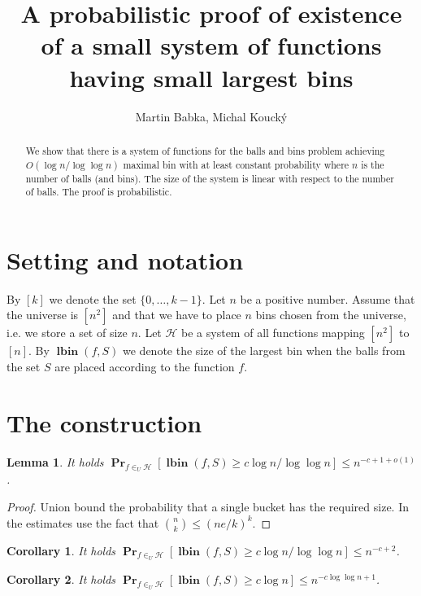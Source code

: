 \documentclass{article}
\title{A probabilistic proof of existence of a small system of functions having small largest bins}
\author{Martin Babka, Michal Kouck\'y}
\newcommand{\lbin}[2]{\operatorname{\mathbf{lbin}}({#1}, {#2})}
\newcommand{\probs}[2]{\operatorname{\mathbf{Pr}}_{{#1}}\left[{#2}\right]}
\newtheorem{lemma}{Lemma}
\newtheorem{corollary}{Corollary}
\begin{document}
\maketitle

\begin{abstract}
We show that there is a system of functions for the balls and bins problem achieving $O(\log n/ \log \log n)$ maximal bin with at least constant probability where $n$ is the number of balls (and bins). 
The size of the system is linear with respect to the number of balls.
The proof is probabilistic.
\end{abstract}

\section{Setting and notation}

By $[k]$ we denote the set $\{0, \dots, k - 1\}$. 
Let $n$ be a positive number.
Assume that the universe is $[n^2]$ and that we have to place $n$ bins chosen from the universe, i.e. we store a set of size $n$.
Let $\mathcal{H}$ be a system of all functions mapping $[n^2]$ to $[n]$.
By $\lbin{f}{S}$ we denote the size of the largest bin when the balls from the set $S$ are placed according to the function $f$.

\section{The construction}
\begin{lemma}
It holds $\probs{f\in_U\mathcal{H}}{\lbin f S \geq c \log n / \log \log n} \leq n^{-c + 1 + o(1)}$.
\end{lemma}
\begin{proof}
Union bound the probability that a single bucket has the required size. In the estimates use the fact that $\binom{n}{k} \leq (ne/k)^k$.
\end{proof}

\begin{corollary}
\label{corollary-single-function}
It holds $\probs{f\in_U\mathcal{H}}{\lbin f S \geq c \log n / \log \log n} \leq n^{-c + 2}$.
\end{corollary}
\begin{corollary}
\label{corollary-single-function-polylog}
It holds $\probs{f\in_U\mathcal{H}}{\lbin f S \geq c \log n} \leq n^{-c \log \log n + 1}$.
\end{corollary}
\end{document}
